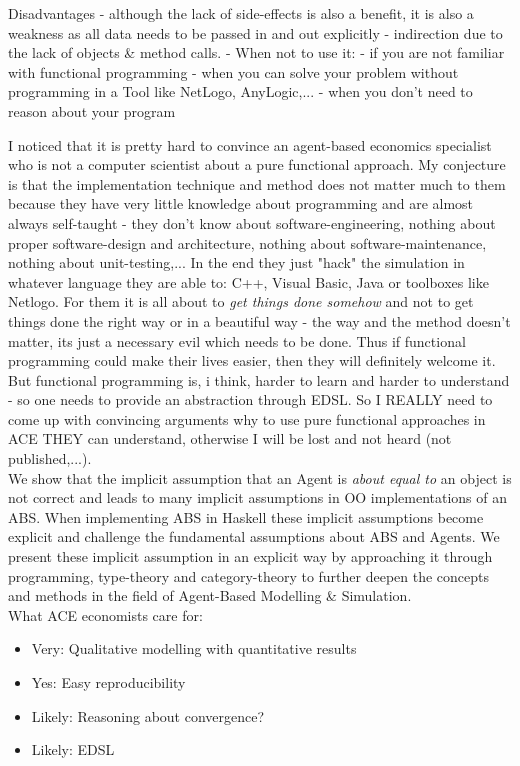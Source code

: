 Disadvantages
- although the lack of side-effects is also a benefit, it is also a weakness as all data needs to be passed in and out explicitly 
- indirection due to the lack of objects \& method calls.
- When not to use it: 
	- if you are not familiar with functional programming
	- when you can solve your problem without programming in a Tool like NetLogo, AnyLogic,...
	- when you don't need to reason about your program
	
I noticed that it is pretty hard to convince an agent-based economics specialist who is not a computer scientist about a pure functional approach. My conjecture is that the implementation technique and method does not matter much to them because they have very little knowledge about programming and are almost always self-taught - they don't know about software-engineering, nothing about proper software-design and architecture, nothing about software-maintenance, nothing about unit-testing,... In the end they just "hack" the simulation in whatever language they are able to: C++, Visual Basic, Java or toolboxes like Netlogo. For them it is all about to \textit{get things done somehow} and not to get things done the right way or in a beautiful way - the way and the method doesn't matter, its just a necessary evil which needs to be done. Thus if functional programming could make their lives easier, then they will definitely welcome it. But functional programming is, i think, harder to learn and harder to understand - so one needs to provide an abstraction through EDSL. So I REALLY need to come up with convincing arguments why to use pure functional approaches in ACE THEY can understand, otherwise I will be lost and not heard (not published,...). \\


We show that the implicit assumption that an Agent is \textit{about equal to} an object is not correct and leads to many implicit assumptions in OO implementations of an ABS. When implementing ABS in Haskell these implicit assumptions become explicit and challenge the fundamental assumptions about ABS and Agents. We present these implicit assumption in an explicit way by approaching it through programming, type-theory and category-theory to further deepen the concepts and methods in the field of Agent-Based Modelling \& Simulation.\\

What ACE economists care for:

\begin{itemize}
\item Very: Qualitative modelling with quantitative results
\item Yes: Easy reproducibility
\item Likely: Reasoning about convergence?
\item Likely: EDSL
\end{itemize}

